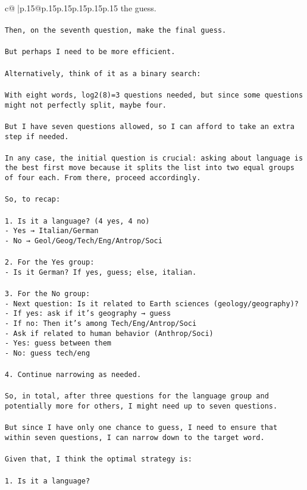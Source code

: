 \documentclass{article}
\begin{document}
{\begin{supertabular}{c@{$\;$}|p{.15\linewidth}@{}p{.15\linewidth}p{.15\linewidth}p{.15\linewidth}p{.15\linewidth}p{.15\linewidth}}
{{{the guess.\\ \tt \\ \tt Then, on the seventh question, make the final guess.\\ \tt \\ \tt But perhaps I need to be more efficient.\\ \tt \\ \tt Alternatively, think of it as a binary search:\\ \tt \\ \tt With eight words, log2(8)=3 questions needed, but since some questions might not perfectly split, maybe four.\\ \tt \\ \tt But I have seven questions allowed, so I can afford to take an extra step if needed.\\ \tt \\ \tt In any case, the initial question is crucial: asking about language is the best first move because it splits the list into two equal groups of four each. From there, proceed accordingly.\\ \tt \\ \tt So, to recap:\\ \tt \\ \tt 1. Is it a language? (4 yes, 4 no)\\ \tt    - Yes → Italian/German\\ \tt    - No → Geol/Geog/Tech/Eng/Antrop/Soci\\ \tt \\ \tt 2. For the Yes group:\\ \tt    - Is it German? If yes, guess; else, italian.\\ \tt \\ \tt 3. For the No group:\\ \tt    - Next question: Is it related to Earth sciences (geology/geography)?\\ \tt      - If yes: ask if it's geography → guess\\ \tt      - If no: Then it's among Tech/Eng/Antrop/Soci\\ \tt         - Ask if related to human behavior (Anthrop/Soci)\\ \tt            - Yes: guess between them\\ \tt            - No: guess tech/eng\\ \tt \\ \tt 4. Continue narrowing as needed.\\ \tt \\ \tt So, in total, after three questions for the language group and potentially more for others, I might need up to seven questions.\\ \tt \\ \tt But since I have only one chance to guess, I need to ensure that within seven questions, I can narrow down to the target word.\\ \tt \\ \tt Given that, I think the optimal strategy is:\\ \tt \\ \tt 1. Is it a language? }}}
\end{supertabular}}
\end{document}
